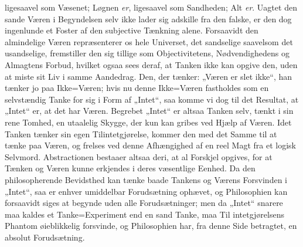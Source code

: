 \documentclass[12pt]{book}
\newcommand{\opage}[1]{\marginnote{\footnotesize\textit{[#1]}}}
\begin{document}
ligesaavel som Væsenet; Løgnen \emph{er}, ligesaavel som Sandheden; Alt \emph{er}. Uagtet den
sande Væren i Begyndelsen selv ikke lader sig adskille fra den falske, er den dog ingenlunde et
Foster af den subjective Tænkning alene. Forsaavidt den almindelige Væren repræsenterer os hele
Universet, det sandselige saavelsom det usandselige, fremstiller den sig tillige som
Objectivitetens, Nødvendighedens og Almagtens Forbud, hvilket ogsaa sees deraf, at Tanken ikke
kan opgive den, uden at miste sit Liv i samme Aandedrag. Den, der tænker: „Væren er slet ikke“,
han tænker jo paa Ikke=Væren; hvis nu denne Ikke=Væren fastholdes som en selvstændig Tanke for
sig i Form af „Intet“, saa komme vi dog til det Resultat, at „Intet“ er, at det har Væren.
Begrebet „Intet“ er altsaa Tanken selv, tænkt i sin rene Tomhed, en utaalelig Skygge, der kun
kan gribes ved Hjælp af Væren. Idet Tanken tænker sin egen Tilintetgjørelse, kommer den med det
Samme til at tænke paa Væren, og frelses ved denne Afhængighed af en reel Magt fra et logisk
Selvmord. Abstractionen bestaaer altsaa deri, at al Forskjel opgives, for at Tænken og Væren
kunne erkjendes i deres væsentlige Eenhed. Da den philosopherende Bevidsthed kan tænke baade
Tankens og Værens Forsvinden i „Intet“, saa er enhver umiddelbar Forudsætning ophævet, og
Philosophien kan forsaavidt siges at begynde uden alle Forudsætninger; men da „Intet“ snarere
maa kaldes et Tanke=Experiment end en sand Tanke, maa Til%
\opage{104}%
intetgjørelsens Phantom øieblikkelig forsvinde, og Philosophien har, fra denne Side betragtet,
en absolut Forudsætning.
\end{document}
